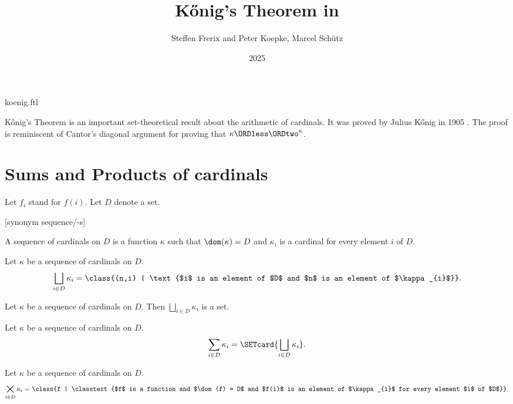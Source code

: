 \documentclass{stex}
\title{Kőnig's Theorem in \Naproche}
\author{Steffen Frerix and Peter Koepke, Marcel Schütz}
\date{2025}
\newcommand{\SumSet}[2]{\bigsqcup_{i \in #2} #1_{i}}
\newcommand{\Sum}[2]{\sum_{i \in #2} #1_{i}}
\newcommand{\ProdSet}[2]{\bigtimes_{i \in #2} #1_{i}}
\begin{document}
\begin{smodule}{koenig.ftl}
\maketitle


\noindent Kőnig's Theorem is an important set-theoretical result about the
arithmetic of cardinals.
It was proved by Julius Kőnig in 1905 \cite[p. 177--180]{Koenig1905}.
The proof is reminiscent of Cantor's diagonal argument for proving that
$\kappa \ORDless \ORDtwo^\kappa$.


\section*{Sums and Products of cardinals}

\begin{forthel}
  Let $f_{i}$ stand for $f(i)$.
  Let $D$ denote a set.

  [synonym sequence/-s]

  \begin{definition*}
    A sequence of cardinals on $D$ is a function $\kappa$ such that
    $\dom(\kappa) = D$ and $\kappa_{i}$ is a cardinal for every element $i$ of $D$.
  \end{definition*}

  \begin{definition*}
    Let $\kappa$ be a sequence of cardinals on $D$.
    \[ \SumSet{\kappa}{D} = \class{(n,i) | \text{$i$ is an element of $D$ and $n$ is an element of $\kappa_{i}$}}. \]
  \end{definition*}

  \begin{axiom*}
    Let $\kappa$ be a sequence of cardinals on $D$.
    Then $\SumSet{\kappa}{D}$ is a set.
  \end{axiom*}

  \begin{definition*}
    Let $\kappa$ be a sequence of cardinals on $D$.
    \[ \Sum{\kappa}{D} = \SETcard{ \SumSet{\kappa}{D} }. \]
  \end{definition*}

  \begin{definition*}
    Let $\kappa$ be a sequence of cardinals on $D$.
    \[ \ProdSet{\kappa}{D} = \class{f | \classtext{$f$ is a function and $\dom(f) = D$ and $f(i)$ is an element of $\kappa_{i}$ for every element $i$ of $D$}}. \]
  \end{definition*}


\end{forthel}
\end{smodule}
\end{document}
